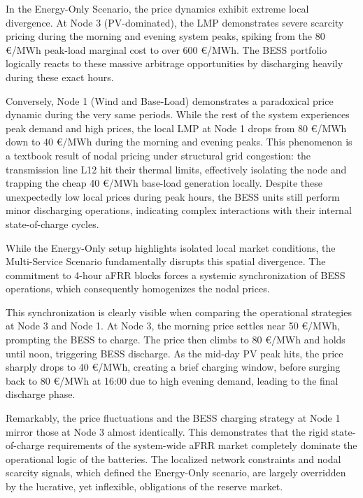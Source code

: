In the Energy-Only Scenario, the price dynamics exhibit extreme local divergence. At Node 3 (PV-dominated), the LMP demonstrates severe scarcity pricing during the morning and evening system peaks, spiking from the 80 €/MWh peak-load marginal cost to over 600 €/MWh. The BESS portfolio logically reacts to these massive arbitrage opportunities by discharging heavily during these exact hours. 

Conversely, Node 1 (Wind and Base-Load) demonstrates a paradoxical price dynamic during the very same periods. While the rest of the system experiences peak demand and high prices, the local LMP at Node 1 drops from 80 €/MWh down to 40 €/MWh during the morning and evening peaks. This phenomenon is a textbook result of nodal pricing under structural grid congestion: the transmission line L12 hit their thermal limits, effectively isolating the node and trapping the cheap 40 €/MWh base-load generation locally. Despite these unexpectedly low local prices during peak hours, the BESS units still perform minor discharging operations, indicating complex interactions with their internal state-of-charge cycles.

While the Energy-Only setup highlights isolated local market conditions, the Multi-Service Scenario fundamentally disrupts this spatial divergence. The commitment to 4-hour aFRR blocks forces a systemic synchronization of BESS operations, which consequently homogenizes the nodal prices. 

This synchronization is clearly visible when comparing the operational strategies at Node 3 and Node 1. At Node 3, the morning price settles near 50 €/MWh, prompting the BESS to charge. The price then climbs to 80 €/MWh and holds until noon, triggering BESS discharge. As the mid-day PV peak hits, the price sharply drops to 40 €/MWh, creating a brief charging window, before surging back to 80 €/MWh at 16:00 due to high evening demand, leading to the final discharge phase. 

Remarkably, the price fluctuations and the BESS charging strategy at Node 1 mirror those at Node 3 almost identically. This demonstrates that the rigid state-of-charge requirements of the system-wide aFRR market completely dominate the operational logic of the batteries. The localized network constraints and nodal scarcity signals, which defined the Energy-Only scenario, are largely overridden by the lucrative, yet inflexible, obligations of the reserve market.

